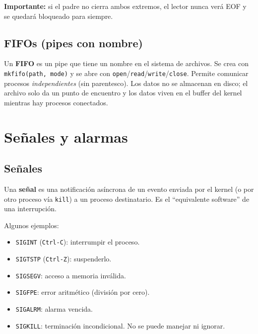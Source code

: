 \documentclass[11pt,a4paper]{article}
\begin{document}
\textbf{Importante:} si el padre no cierra ambos extremos, el lector
nunca verá EOF y se quedará bloqueado para siempre.

\subsection{FIFOs (pipes con nombre)}

Un \textbf{FIFO} es un pipe que tiene un nombre en el sistema de
archivos. Se crea con \texttt{mkfifo(path, mode)} y se abre con
\texttt{open}/\texttt{read}/\texttt{write}/\texttt{close}. Permite
comunicar procesos \emph{independientes} (sin parentesco). Los datos
no se almacenan en disco; el archivo solo da un punto de encuentro y
los datos viven en el buffer del kernel mientras hay procesos
conectados.

\section{Señales y alarmas}

\subsection{Señales}

\begin{definicion}
Una \textbf{señal} es una notificación asíncrona de un evento enviada
por el kernel (o por otro proceso vía \texttt{kill}) a un proceso
destinatario. Es el ``equivalente software'' de una interrupción.
\end{definicion}

Algunos ejemplos:

\begin{itemize}[leftmargin=*]
    \item \texttt{SIGINT} (\texttt{Ctrl-C}): interrumpir el proceso.
    \item \texttt{SIGTSTP} (\texttt{Ctrl-Z}): suspenderlo.
    \item \texttt{SIGSEGV}: acceso a memoria inválida.
    \item \texttt{SIGFPE}: error aritmético (división por cero).
    \item \texttt{SIGALRM}: alarma vencida.
    \item \texttt{SIGKILL}: terminación incondicional. No se puede
        manejar ni ignorar.
\end{itemize}
\end{document}
